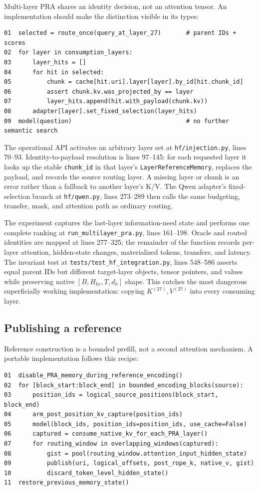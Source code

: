 \documentclass[11pt]{article}
\begin{document}
Multi-layer PRA shares an identity decision, not an attention tensor. An implementation should
make the distinction visible in its types:

\begin{verbatim}
01  selected = route_once(query_at_layer_27)       # parent IDs + scores
02  for layer in consumption_layers:
03      layer_hits = []
04      for hit in selected:
05          chunk = cache[hit.uri].layer[layer].by_id[hit.chunk_id]
06          assert chunk.kv.was_projected_by == layer
07          layer_hits.append(hit.with_payload(chunk.kv))
08      adapter[layer].set_fixed_selection(layer_hits)
09  model(question)                                # no further semantic search
\end{verbatim}

The operational API activates an arbitrary layer set at
\texttt{hf/injection.py}, lines 70--93. Identity-to-payload resolution is lines 97--145: for
each requested layer it looks up the stable \texttt{chunk\_id} in that layer's
\texttt{LayerReferenceMemory}, replaces the payload, and records the source routing layer. A
missing layer or chunk is an error rather than a fallback to another layer's K/V. The Qwen
adapter's fixed-selection branch at \texttt{hf/qwen.py}, lines 273--289 then calls the same
budgeting, transfer, mask, and attention path as ordinary routing.

The experiment captures the last-layer information-need state and performs one complete ranking
at \texttt{run\_multilayer\_pra.py}, lines 161--198. Oracle and routed identities are mapped at
lines 277--325; the remainder of the function records per-layer attention, hidden-state changes,
materialized tokens, transfers, and latency. The invariant test at
\texttt{tests/test\_hf\_integration.py}, lines 548--586 asserts equal parent IDs but different
target-layer objects, tensor pointers, and values while preserving native
$[B,H_{kv},T,d_h]$ shape. This catches the most dangerous superficially working implementation:
copying $K^{(27)},V^{(27)}$ into every consuming layer.

\subsection{Publishing a reference}

Reference construction is a bounded prefill, not a second attention mechanism. A portable
implementation follows this recipe:

\begin{verbatim}
01  disable_PRA_memory_during_reference_encoding()
02  for [block_start:block_end] in bounded_encoding_blocks(source):
03      position_ids = logical_source_positions(block_start, block_end)
04      arm_post_position_kv_capture(position_ids)
05      model(block_ids, position_ids=position_ids, use_cache=False)
06      captured = consume_native_kv_for_each_PRA_layer()
07      for routing_window in overlapping_windows(captured):
08          gist = pool(routing_window.attention_input_hidden_state)
09          publish(uri, logical_offsets, post_rope_k, native_v, gist)
10          discard_token_level_hidden_state()
11  restore_previous_memory_state()
\end{verbatim}
\end{document}
